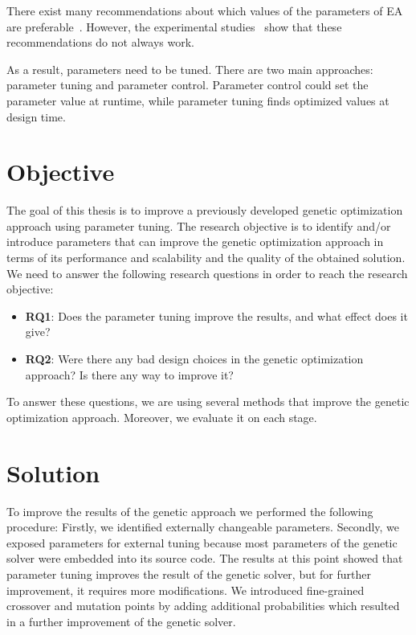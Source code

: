 There exist many recommendations about which values of the parameters of EA are preferable~\cite{de2007parameter, sipper2018investigating}. However, the experimental studies~\cite{de2007parameter, shahookar1990genetic, gockel1997influencing} show that these recommendations do not always work. 

As a result, parameters need to be tuned. There are two main approaches: parameter tuning and parameter control. Parameter control could set the parameter value at runtime, while parameter tuning finds optimized values at design time.




\section{Objective}
The goal of this thesis is to improve a previously developed genetic optimization approach using parameter tuning.
The research objective is to identify and/or introduce parameters that can improve the genetic optimization approach in terms of its performance and scalability and the quality of the obtained solution. We need to answer the following research questions in order to reach the research objective: 
\begin{itemize}
	\item \textbf{RQ1}: Does the parameter tuning improve the results, and what effect does it give?
	\item \textbf{RQ2}: Were there any bad design choices in the genetic optimization approach? Is there any way to improve it?
\end{itemize}

To answer these questions, we are using several methods that improve the genetic optimization approach. Moreover, we evaluate it on each stage. 

\section{Solution}

To improve the results of the genetic approach we performed the following procedure:
Firstly, we identified externally changeable parameters. 
Secondly, we exposed parameters for external tuning because most parameters of the genetic solver were embedded into its source code. 
The results at this point showed that parameter tuning improves the result of the genetic solver, but for further improvement, it requires more modifications.
We introduced fine-grained crossover and mutation points by adding additional probabilities which resulted in a further improvement of the genetic solver.

